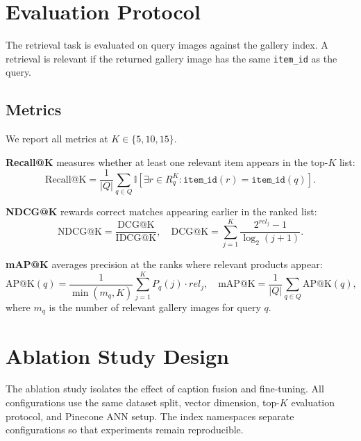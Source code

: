 \documentclass[12pt, a4paper]{article}
\begin{document}
\section{Evaluation Protocol}

The retrieval task is evaluated on query images against the gallery index. A retrieval is relevant if the returned gallery image has the same \texttt{item\_id} as the query.

\subsection{Metrics}

We report all metrics at $K \in \{5, 10, 15\}$.

\textbf{Recall@K} measures whether at least one relevant item appears in the top-$K$ list:
\begin{equation}
    \text{Recall@K} =
    \frac{1}{|Q|}
    \sum_{q \in Q}
    \mathbb{I}
    \left[
        \exists r \in R_q^K:
        \texttt{item\_id}(r) = \texttt{item\_id}(q)
    \right].
\end{equation}

\textbf{NDCG@K} rewards correct matches appearing earlier in the ranked list:
\begin{equation}
    \text{NDCG@K} =
    \frac{\text{DCG@K}}{\text{IDCG@K}},
    \quad
    \text{DCG@K} =
    \sum_{j=1}^{K}
    \frac{2^{rel_j}-1}{\log_2(j+1)}.
\end{equation}

\textbf{mAP@K} averages precision at the ranks where relevant products appear:
\begin{equation}
    \text{AP@K}(q) =
    \frac{1}{\min(m_q, K)}
    \sum_{j=1}^{K}
    P_q(j) \cdot rel_j,
    \quad
    \text{mAP@K} =
    \frac{1}{|Q|}\sum_{q \in Q}\text{AP@K}(q),
\end{equation}
where $m_q$ is the number of relevant gallery images for query $q$.

\section{Ablation Study Design}

The ablation study isolates the effect of caption fusion and fine-tuning. All configurations use the same dataset split, vector dimension, top-$K$ evaluation protocol, and Pinecone ANN setup. The index namespaces separate configurations so that experiments remain reproducible.
\end{document}
